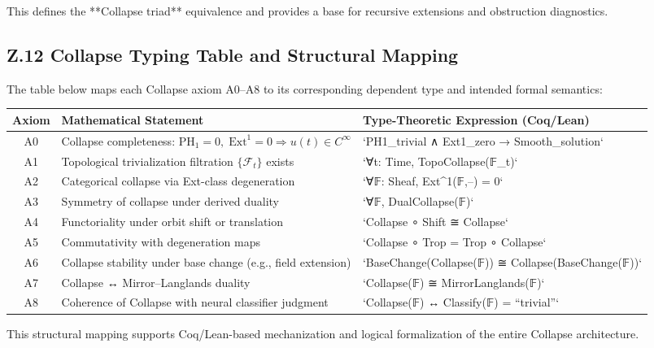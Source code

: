 \documentclass[11pt]{article}
\begin{document}
This defines the **Collapse triad** equivalence and provides a base for recursive extensions and obstruction diagnostics.


\subsection*{Z.12 Collapse Typing Table and Structural Mapping}

The table below maps each Collapse axiom A0–A8 to its corresponding dependent type and intended formal semantics:

\begin{center}
\renewcommand{\arraystretch}{1.3}
\begin{tabular}{|c|p{7cm}|p{5.5cm}|}
\hline
\textbf{Axiom} & \textbf{Mathematical Statement} & \textbf{Type-Theoretic Expression (Coq/Lean)} \\
\hline
A0 & Collapse completeness: \( \mathrm{PH}_1 = 0, \; \mathrm{Ext}^1 = 0 \Rightarrow u(t) \in C^\infty \) & `PH1_trivial ∧ Ext1_zero → Smooth_solution` \\
A1 & Topological trivialization filtration \( \{\mathcal{F}_t\} \) exists & `∀t: Time, TopoCollapse(𝔽_t)` \\
A2 & Categorical collapse via Ext-class degeneration & `∀𝔽: Sheaf, Ext^1(𝔽,–) = 0` \\
A3 & Symmetry of collapse under derived duality & `∀𝔽, DualCollapse(𝔽)` \\
A4 & Functoriality under orbit shift or translation & `Collapse ∘ Shift ≅ Collapse` \\
A5 & Commutativity with degeneration maps & `Collapse ∘ Trop = Trop ∘ Collapse` \\
A6 & Collapse stability under base change (e.g., field extension) & `BaseChange(Collapse(𝔽)) ≅ Collapse(BaseChange(𝔽))` \\
A7 & Collapse ↔ Mirror–Langlands duality & `Collapse(𝔽) ≅ MirrorLanglands(𝔽)` \\
A8 & Coherence of Collapse with neural classifier judgment & `Collapse(𝔽) ↔ Classify(𝔽) = “trivial”` \\
\hline
\end{tabular}
\end{center}

This structural mapping supports Coq/Lean-based mechanization and logical formalization of the entire Collapse architecture.
\end{document}
